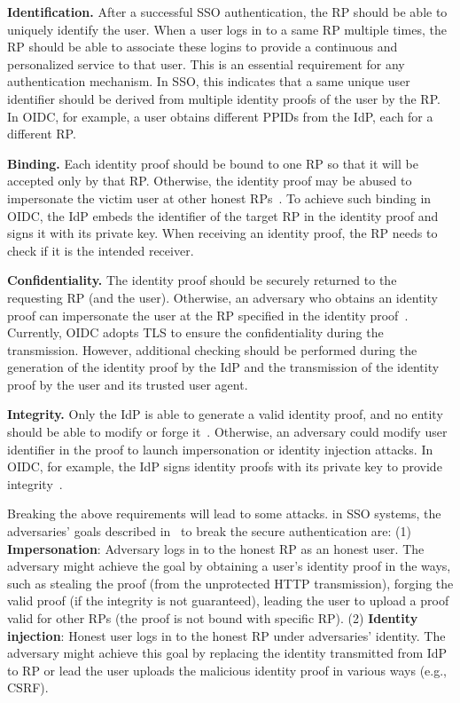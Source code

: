 \vspace{1mm}\noindent\textbf{Identification.} %
After a successful SSO authentication, the RP should be able to uniquely identify the user. When a user logs in to a same RP multiple times, the RP should be able to associate these logins to provide a continuous and personalized service to that user. This is an essential requirement for any authentication mechanism. In SSO, this indicates that a same unique user identifier should be derived from multiple identity proofs of the user by the RP. In OIDC, for example, a user obtains different PPIDs from the IdP, each for a different RP.


\vspace{1mm}\noindent\textbf{Binding.} Each identity proof should be bound to one RP so that it will be accepted only by that RP. Otherwise, the identity proof may be abused to impersonate the victim user at other honest RPs~\cite{ChenPCTKT14, WangZLG16}. To achieve such binding in OIDC, the IdP embeds the identifier of the target RP in the identity proof and signs it with its private key. When receiving an identity proof, the RP needs to check if it is the intended receiver.

\vspace{1mm}\noindent\textbf{Confidentiality.} The identity proof should be securely returned to the requesting RP (and the user). Otherwise, an adversary who obtains an identity proof can impersonate the user at the RP specified in the identity proof~\cite{ChenPCTKT14,FettKS16,WangZLG16}. Currently, OIDC adopts TLS to ensure the confidentiality during the transmission. However, additional checking should be performed during the generation of the identity proof by the IdP and the transmission of the identity proof by the user and its trusted user agent.

\vspace{1mm}\noindent\textbf{Integrity.} Only the IdP is able to generate a valid identity proof,
    and no entity should be able to modify or forge it~\cite{WangZLG16}. Otherwise, an adversary could modify user identifier in the proof to launch impersonation or identity injection attacks. In OIDC, for example, the IdP signs identity proofs with its private key to provide integrity~\cite{WangCW12, SomorovskyMSKJ12}.


\vspace{1mm}Breaking the above requirements will lead to some attacks.
in SSO systems, the adversaries' goals described in~\cite{SPRESSO} to break the secure authentication are:
(1) \textbf{Impersonation}: Adversary logs in to the honest RP as an honest user. The adversary might achieve the goal by obtaining a user's identity proof in the ways, such as stealing the proof (from the unprotected HTTP transmission), forging the valid proof (if the integrity is not guaranteed), leading the user to upload a proof valid for other RPs (the proof is not bound with specific RP).
(2) \textbf{Identity injection}: Honest user logs in to the honest RP under adversaries' identity. The adversary might achieve this goal by replacing the identity transmitted from IdP to RP or lead the user uploads the malicious identity proof in various ways (e.g., CSRF).

